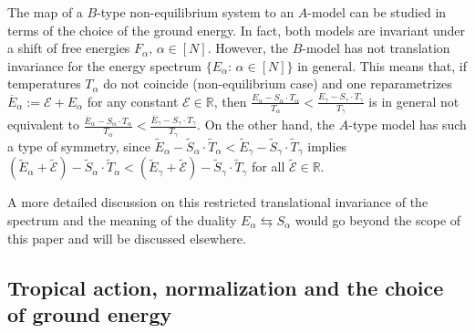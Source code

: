 \documentclass[11pt,british,reqno]{article}
\numberwithin{equation}{section}
\numberwithin{figure}{section}
\numberwithin{table}{section}
\theoremstyle{definition}
\theoremstyle{definition}
\theoremstyle{plain}
\theoremstyle{plain}
\theoremstyle{remark}
\theoremstyle{plain}
\numberwithin{equation}{section}
\numberwithin{figure}{section}
\numberwithin{table}{section}
\theoremstyle{plain}
\begin{document}
The map of a $B$-type non-equilibrium system to an $A$-model can be studied in terms of the choice of the ground energy. In fact, both models are invariant under a shift of free energies $F_{\alpha},\,\alpha \in [N]$. However, the $B$-model has not translation invariance for the energy spectrum $\{E_{\alpha}:\,\alpha \in [N]\}$ in general. This means that, if temperatures $T_{\alpha}$ do not coincide (non-equilibrium case) and 
one reparametrizes $\overline{E}_{\alpha}:=\mathcal{E}+E_{\alpha}$
for any constant $\mathcal{E}\in\mathbb{R}$,
then ${\displaystyle \frac{E_{\alpha}-S_{\alpha}\cdot T_{\alpha}}{T_{\alpha}}<\frac{E_{\gamma}-S_{\gamma}\cdot T_{\gamma}}{T_{\gamma}}}$ is in general not equivalent to ${\displaystyle \frac{\overline{E}_{\alpha}-S_{\alpha}\cdot T_{\alpha}}{T_{\alpha}}<\frac{\overline{E}_{\gamma}-S_{\gamma}\cdot T_{\gamma}}{T_{\gamma}}}$. On the other hand, the $A$-type model
has such a type of symmetry, since $\tilde{E}_{\alpha}-\tilde{S}_{\alpha}\cdot\tilde{T}_{\alpha}<\tilde{E}_{\gamma}-\tilde{S}_{\gamma}\cdot\tilde{T}_{\gamma}$
implies $(\tilde{E}_{\alpha}+\tilde{\mathcal{E}})-\tilde{S}_{\alpha}\cdot\tilde{T}_{\alpha}<(\tilde{E}_{\gamma}+\tilde{\mathcal{E}})-\tilde{S}_{\gamma}\cdot\tilde{T}_{\gamma}$ for all $\tilde{\mathcal{E}}\in\mathbb{R}$. 

A more detailed discussion on this restricted translational invariance of the spectrum and the meaning of the duality $E_{\alpha}\leftrightarrows S_{\alpha}$ would go beyond the scope of this paper and will be discussed elsewhere. 

\subsection{\label{subsec: Tropical
probability and tropical symmetry} Tropical action, normalization and the choice of  ground energy}
\end{document}
